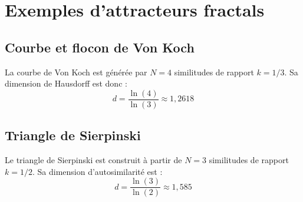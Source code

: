 \documentclass[11pt,a4paper]{article}
\begin{document}
\section{Exemples d'attracteurs fractals}

\subsection{Courbe et flocon de Von Koch}
La courbe de Von Koch est générée par $N = 4$ similitudes de rapport $k = 1/3$. Sa dimension de Hausdorff est donc :
\begin{equation}
d = \frac{\ln(4)}{\ln(3)} \approx 1{,}2618
\end{equation}

\subsection{Triangle de Sierpinski}
Le triangle de Sierpinski est construit à partir de $N = 3$ similitudes de rapport $k = 1/2$. Sa dimension d'autosimilarité est :
\begin{equation}
d = \frac{\ln(3)}{\ln(2)} \approx 1{,}585
\end{equation}
\end{document}
